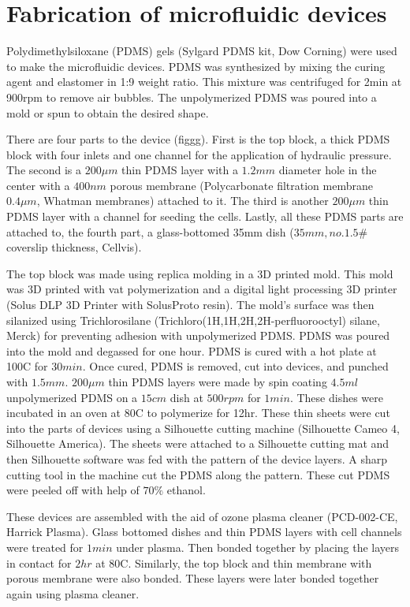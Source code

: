\section{Fabrication of microfluidic devices}
 
Polydimethylsiloxane (PDMS) gels (Sylgard PDMS kit, Dow Corning) were used to make the microfluidic devices. PDMS was synthesized by mixing the curing agent and elastomer in 1:9 weight ratio. This mixture was centrifuged for 2min at 900rpm to remove air bubbles. The unpolymerized PDMS was poured into a mold or spun to obtain the desired shape. 

There are four parts to the device (figgg). First is the top block, a thick PDMS block with four inlets and one channel for the application of hydraulic pressure. The second is a $200 \mu m$ thin PDMS layer with a $1.2mm$ diameter hole in the center with a $400nm$ porous membrane (Polycarbonate filtration membrane $0.4\mu m$, Whatman membranes) attached to it. The third is another $200 \mu m$ thin PDMS layer with a channel for seeding the cells. Lastly, all these PDMS parts are attached to, the fourth part, a glass-bottomed 35mm dish ($35mm, no. 1.5\#$ coverslip thickness, Cellvis). 

The top block was made using replica molding in a 3D printed mold. This mold was 3D printed with vat polymerization and a digital light processing 3D printer (Solus DLP 3D Printer with SolusProto resin). The mold’s surface was then silanized using Trichlorosilane (Trichloro(1H,1H,2H,2H-perfluorooctyl) silane, Merck) for preventing adhesion with unpolymerized PDMS. PDMS was poured into the mold and degassed for one hour. PDMS is cured with a hot plate at 100\textdegree{}C for $30min$. Once cured, PDMS is removed, cut into devices, and punched with $1.5mm$. $200\mu m$ thin PDMS layers were made by spin coating $4.5ml$ unpolymerized PDMS on a $15cm$ dish at $500rpm$ for $1min$. These dishes were incubated in an oven at 80\textdegree{}C to polymerize for 12hr. These thin sheets were cut into the parts of devices using a Silhouette cutting machine (Silhouette Cameo 4, Silhouette America). The sheets were attached to a Silhouette cutting mat and then Silhouette software was fed with the pattern of the device layers. A sharp cutting tool in the machine cut the PDMS along the pattern. These cut PDMS were peeled off with help of $70\%$ ethanol. 

These devices are assembled with the aid of ozone plasma cleaner (PCD-002-CE, Harrick Plasma). Glass bottomed dishes and thin PDMS layers with cell channels were treated for $1 min$ under plasma. Then bonded together by placing the layers in contact for $2 hr$ at 80\textdegree{}C. Similarly, the top block and thin membrane with porous membrane were also bonded. These layers were later bonded together again using plasma cleaner.

